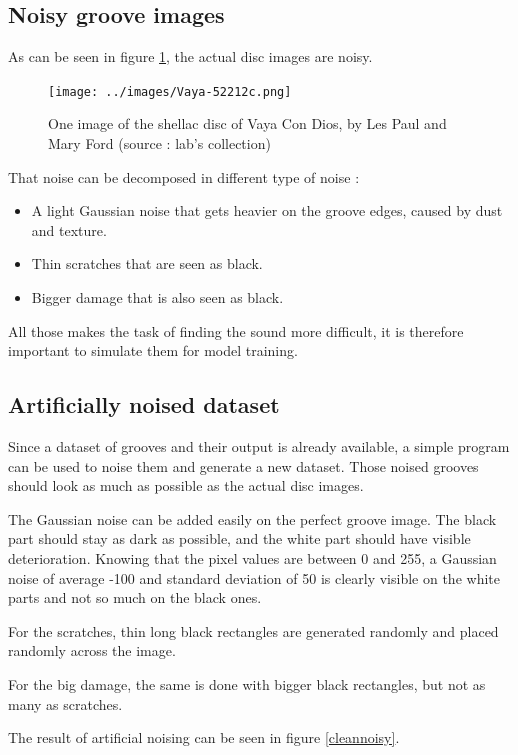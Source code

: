 \documentclass[12pt, twoside]{article}
\begin{document}
\subsection{Noisy groove images}
As can be seen in figure \ref{vayabis}, the actual disc images are noisy. 
\begin{figure}
	\centering
	\texttt{[image: ../images/Vaya-52212c.png]}
	\caption{One image of the shellac disc of Vaya Con Dios, by Les Paul and Mary Ford (source : lab's collection)}
	\label{vayabis}
\end{figure}
That noise can be decomposed in different type of noise :
\begin{itemize}
	\item A light Gaussian noise that gets heavier on the groove edges, caused by dust and texture.
	\item Thin scratches that are seen as black.
	\item Bigger damage that is also seen as black.
\end{itemize}
All those makes the task of finding the sound more difficult, it is therefore important to simulate them for model training.
\subsection{Artificially noised dataset}
Since a dataset of grooves and their output is already available, a simple program can be used to noise them and generate a new dataset. Those noised grooves should look as much as possible as the actual disc images.

The Gaussian noise can be added easily on the perfect groove image. The black part should stay as dark as possible, and the white part should have visible deterioration. Knowing that the pixel values are between 0 and 255, a Gaussian noise of average -100 and standard deviation of 50 is clearly visible on the white parts and not so much on the black ones.

For the scratches, thin long black rectangles are generated randomly and placed randomly across the image.

For the big damage, the same is done with bigger black rectangles, but not as many as scratches.

The result of artificial noising can be seen in figure \ref{cleannoisy}.
\end{document}
